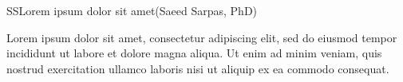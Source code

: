 \begin{section}{SS}{Lorem ipsum dolor sit amet}{(Saeed Sarpas, PhD)}
  \begin{minipage}{\linewidth}
    \strut {\small Lorem ipsum dolor sit amet, consectetur adipiscing elit, sed
      do eiusmod tempor incididunt ut labore et dolore magna aliqua. Ut enim ad
      minim veniam, quis nostrud exercitation ullamco laboris nisi ut aliquip ex
      ea commodo consequat.}
  \end{minipage}
\end{section}